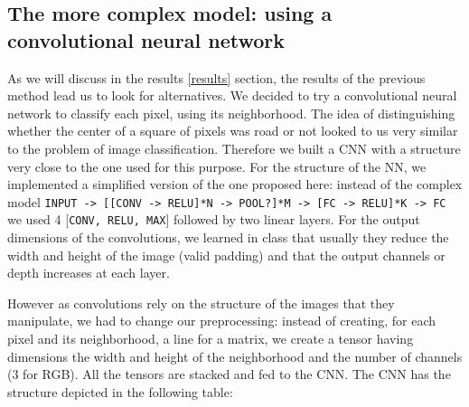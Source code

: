 \documentclass[10pt,conference,compsocconf]{IEEEtran}
\begin{document}
\subsection{The more complex model: using a convolutional neural network}
As we will discuss in the results \ref{results} section, the results of the previous method lead us to look for alternatives.
We decided to try a convolutional neural network to classify each pixel, using its neighborhood. The idea of distinguishing whether the center of a square of pixels was road or not looked to us very similar to the problem of image classification. Therefore we built a CNN with a structure very close to the one used for this purpose. For the structure of the NN, we implemented a simplified version of the one proposed here\cite{stanford}: instead of the complex model \texttt{INPUT -> [[CONV -> RELU]*N -> POOL?]*M -> [FC -> RELU]*K -> FC} we used 4 [\texttt{CONV, RELU, MAX}] followed by two linear layers. For the output dimensions of the convolutions, we learned in class that usually they reduce the width and height of the image (valid padding) and that the output channels or depth increases at each layer.

However as convolutions rely on the structure of the images that they manipulate, we had to change our preprocessing: instead of creating, for each pixel and its neighborhood, a line for a matrix, we create a tensor having dimensions the width and height of the neighborhood and the number of channels (3 for RGB). All the tensors are stacked and fed to the CNN.
The CNN has the structure depicted in the following table:
\end{document}

